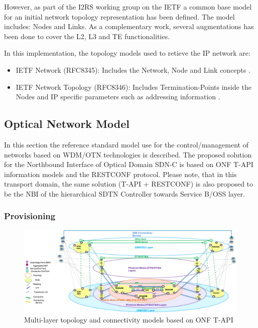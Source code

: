 \documentclass[a4paper,fleqn]{cas-dc}
\begin{document}
However, as part of the I2RS working group on the IETF a common base model for an initial network topology representation has been defined. The model includes: Nodes and Links. As a complementary work, several augmentations has been done to cover the L2, L3 and TE functionalities.

In this implementation, the topology models used to retieve the IP network are: 
\begin{itemize}
\item IETF Network (RFC8345): Includes the Network, Node and Link concepts \cite{clemm2018yang}.
\item IETF Network Topology (RFC8346): Includes Termination-Points inside the Nodes and IP specific parameters such as addressing information \cite{varga2018internet}.
\end{itemize}

\subsection{Optical Network Model}
\label{section:OPTmodels}

In this section the reference standard model use for the control/management of networks based on WDM/OTN technologies is described. The proposed solution for the Northbound Interface of Optical Domain SDN-C is based on ONF T-API information models and the RESTCONF protocol. Please note, that in this transport domain, the same solution (T-API + RESTCONF) is also proposed to be the NBI of the hierarchical SDTN Controller towards Service B/OSS layer.

\subsubsection{Provisioning}

\begin{figure}
	\centering
		\includegraphics[scale=0.8]{figs/ONF-T-API.png}
	\caption{Multi-layer topology and connectivity models based on ONF T-API}
	\label{FIG:ONF-T-API}
\end{figure}
\end{document}
